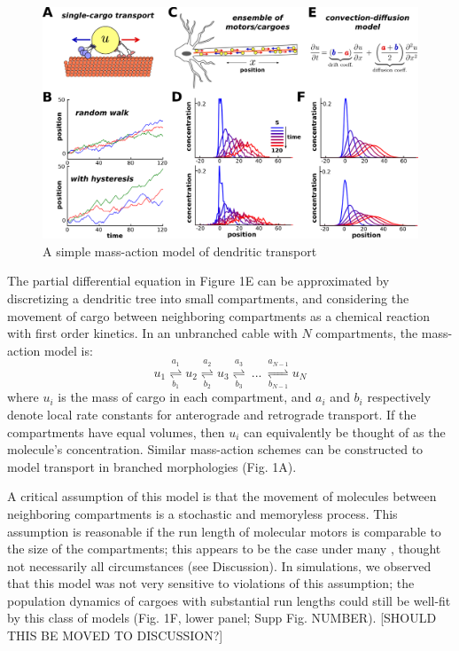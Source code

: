 \documentclass[fleqn,10pt]{wlpeerj}
\begin{document}
\begin{figure}[h!]
\begin{center}
\includegraphics[width=1\columnwidth]{00_stochastic.png}
\caption{A simple mass-action model of dendritic transport}
\end{center}
\end{figure}

The partial differential equation in Figure 1E can be approximated by discretizing a dendritic tree into small compartments, and considering the movement of cargo between neighboring compartments as a chemical reaction with first order kinetics. In an unbranched cable with $N$ compartments, the mass-action model is:
\begin{equation}
u_1 \underset{b_1}{\overset{a_1}{\rightleftharpoons}} u_2 \underset{b_2}{\overset{a_2}{\rightleftharpoons}} u_3 \underset{b_3}{\overset{a_3}{\rightleftharpoons}}~...~\underset{b_{N-1}}{\overset{a_{N-1}}{\rightleftharpoons}}  u_N
\end{equation}
where $u_i$ is the mass of cargo in each compartment, and $a_i$ and $b_i$ respectively denote local rate constants for anterograde and retrograde transport. If the compartments have equal volumes, then $u_i$ can equivalently be thought of as the molecule's concentration. Similar mass-action schemes can be constructed to model transport in branched morphologies (Fig. 1A).

A critical assumption of this model is that the movement of molecules between neighboring compartments is a stochastic and memoryless process. This assumption is reasonable if the run length of molecular motors is comparable to the size of the compartments; this appears to be the case under many \citep{Muller_2008,Verbrugge_2009}, thought not necessarily all \citep{Dynes_2007} circumstances (see Discussion). In simulations, we observed that this model was not very sensitive to violations of this assumption; the population dynamics of cargoes with substantial run lengths could still be well-fit by this class of models (Fig. 1F, lower panel; Supp Fig. NUMBER). [SHOULD THIS BE MOVED TO DISCUSSION?]
\end{document}
